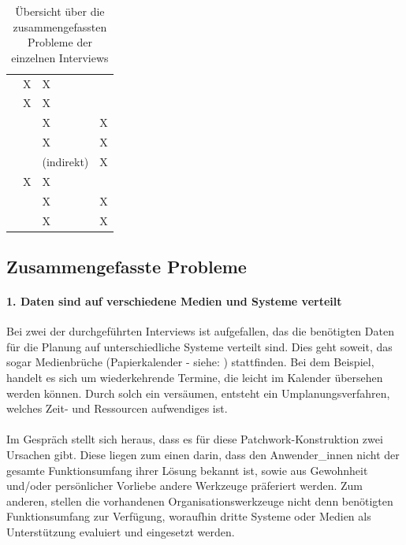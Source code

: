 \documentclass[../Bachelorarbeit.tex]{subfiles}
\begin{document}
\def\arraystretch{1.5} %
\begin{table}[h]
	\begin{tabular}{|p{5cm}|p{}|p{}|p{}|}
		\hline  
			& \ctab \nameref{anhang:interview1} 
			& \ctab \nameref{anhang:interview2} 
			& \ctab \nameref{anhang:interview3} \\ 
		\hline 
			\nameref{p1}
			& \ctab X
			& \ctab X
			& \ctab  \\ 
		\hline 
			\nameref{p2}
			& \ctab  X
			& \ctab X
			& \ctab  \\ 
		
		\hline 
			\nameref{p3}
			& \ctab  
			& \ctab X
			& \ctab X \\ 
		\hline 
			\nameref{p4}
			& \ctab 
			& \ctab  X
			& \ctab X \\ 
		\hline 
			\nameref{p5}
			& \ctab 
			& \ctab (indirekt)
			& \ctab X \\ 
		\hline 
			\nameref{p6}
			& \ctab X
			& \ctab X
			& \ctab  \\ 
		\hline 
			\nameref{p7}
			& \ctab 
			& \ctab X
			& \ctab X \\
		\hline 
			\nameref{p8}
			& \ctab
			& \ctab X
			& \ctab X \\
		\hline 
	\end{tabular} 
	\caption[Zusammenfassung der Probleme]{Übersicht über die zusammengefassten Probleme der einzelnen Interviews}
	\label{tab:problemeInterviews}
\end{table}

\subsection*{Zusammengefasste Probleme}

\paragraph*{1. Daten sind auf verschiedene Medien und Systeme verteilt}
\label{p1}
Bei zwei der durchgeführten Interviews ist aufgefallen, das die benötigten Daten für die Planung auf unterschiedliche Systeme verteilt sind.
Dies geht soweit, das sogar Medienbrüche (Papierkalender - siehe: ) stattfinden.
Bei dem Beispiel, handelt es sich um wiederkehrende Termine, die leicht im Kalender übersehen werden können. Durch solch ein versäumen, entsteht ein Umplanungsverfahren, welches Zeit- und Ressourcen aufwendiges ist.\\
\\
Im Gespräch stellt sich heraus, dass es für diese Patchwork-Konstruktion zwei Ursachen gibt.
Diese liegen zum einen darin, dass den Anwender\_innen nicht der gesamte Funktionsumfang ihrer Lösung bekannt ist, sowie aus Gewohnheit und/oder persönlicher Vorliebe andere Werkzeuge präferiert werden.
Zum anderen, stellen die vorhandenen Organisationswerkzeuge nicht denn benötigten Funktionsumfang zur Verfügung, woraufhin dritte Systeme oder Medien als Unterstützung evaluiert und eingesetzt werden. 
\end{document}
